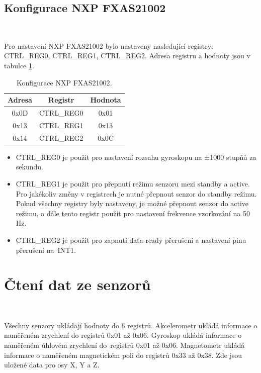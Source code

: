 \subsection{Konfigurace NXP FXAS21002}\

Pro nastavení NXP FXAS21002 bylo nastaveny nasledující registry: CTRL\_REG0,
CTRL\_REG1, CTRL\_REG2. Adresa registru a hodnoty jsou v tabulce
\ref{tab:FXAS21002}.

\begin{table}[!h]
    \centering
    \begin{tabular}{ccc}
        \hline
        \textbf{Adresa} & \textbf{Registr} & \textbf{Hodnota} \\
        \hline
        0x0D            & CTRL\_REG0       & 0x01             \\
        0x13            & CTRL\_REG1       & 0x13             \\
        0x14            & CTRL\_REG2       & 0x0C             \\
        \hline
    \end{tabular}
    \caption{Konfigurace NXP FXAS21002\cite{FXAS21002}.}
    \label{tab:FXAS21002}
\end{table}

\begin{itemize}
    \item CTRL\_REG0 je použit pro nastavení rozsahu gyroskopu na ±1000 stupňů za
    sekundu\cite{FXAS21002}.

    \item CTRL\_REG1 je použit pro přepnutí režimu senzoru mezi standby a active.
    Pro jakékoliv změny v registrech je nutné přepnout senzor do standby režimu.
    Pokud všechny registry byly nastaveny, je možné přepnout senzor do active
    režimu, a dále tento registr použit pro nastavení frekvence vzorkování na 50
    Hz\cite{FXAS21002}.

    \item CTRL\_REG2 je použit pro zapnutí data-ready přerušení a nastavení pinu
    přerušení na~INT1\cite{FXAS21002}.
\end{itemize}

\section{Čtení dat ze senzorů}\

Všechny senzory ukládají hodnoty do 6 registrů. Akcelerometr ukládá informace o
naměřeném zrychlení do registrů 0x01 až 0x06. Gyroskop ukládá informace o naměřeném
úhlovém zrychlení do~registrů 0x01 až 0x06. Magnetometr ukládá informace o naměřeném
magnetickém poli do registrů 0x33 až 0x38. Zde jsou uložené data pro osy X, Y a Z.

